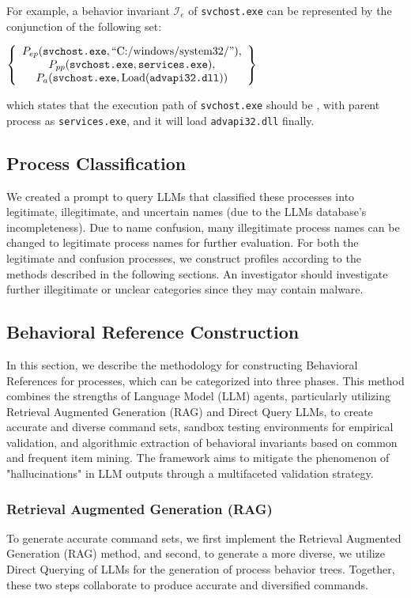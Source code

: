 For example, a behavior invariant $\mathcal{I}_e$ of \texttt{svchost.exe} can be represented by the conjunction of the following set: 

\begin{center}
$ \left\{
\begin{array}{c}
P_{ep}(\texttt{svchost.exe}, \text{``C:/windows/system32/''}),\\
 P_{pp}(\texttt{svchost.exe}, \texttt{services.exe}),\\
 P_{a}(\texttt{svchost.exe}, \text{Load(\texttt{advapi32.dll})})
\end{array} \right\}$
\end{center}

which states that the execution path of \texttt{svchost.exe} should be , with parent process 
as \texttt{services.exe}, and it will load \texttt{advapi32.dll} finally.


\subsection{Process Classification}
We created a prompt to query LLMs that classified these processes into legitimate, illegitimate, and uncertain names (due to the LLMs database's incompleteness).
Due to name confusion, many illegitimate process names can be changed to legitimate process names for further evaluation.
For both the legitimate and confusion processes, we construct profiles according to the methods described in the following sections. An investigator should investigate further illegitimate or unclear categories since they may contain malware.


\subsection{Behavioral Reference Construction}
In this section, we describe the methodology for constructing Behavioral References for processes, which can be categorized into three phases. 
This method combines the strengths of Language Model (LLM) agents, particularly utilizing Retrieval Augmented Generation (RAG) and Direct Query LLMs, to create accurate and diverse command sets, sandbox testing environments for empirical validation, and algorithmic extraction of behavioral invariants based on common and frequent item mining. The framework aims to mitigate the phenomenon of "hallucinations" in LLM outputs through a multifaceted validation strategy.


\subsubsection{Retrieval Augmented Generation (RAG)}
To generate accurate command sets, we first implement the Retrieval Augmented Generation (RAG) method, and second, to generate a more diverse, we utilize Direct Querying of LLMs for the generation of process behavior trees. Together, these two steps collaborate to produce accurate and diversified commands.

